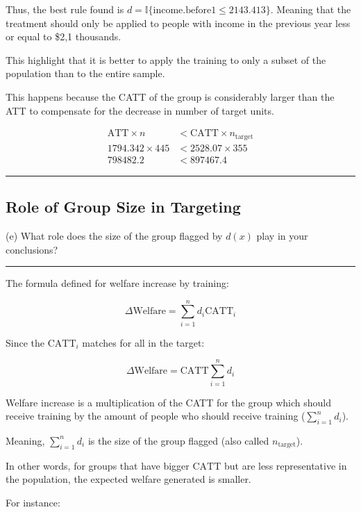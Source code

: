 \documentclass{article}
\newenvironment{colorparagraph}[1]{\par\color{#1}}{\par}
\begin{document}
Thus, the best rule found is $d = \mathbb{I} \{ \text{income.before1} \leq 2143.413\}$. Meaning that the treatment should only be applied to people with income in the previous year less or equal to \$2,1 thousands.

This highlight that it is better to apply the training to only a subset of the population than to the entire sample.

This happens because the CATT of the group is considerably larger than the ATT to compensate for the decrease in number of target units.

$$
\begin{aligned}
    \text{ATT} \times n &< \text{CATT} \times n_{\text{target}} \\
    1794.342 \times 445 &< 2528.07 \times 355 \\
    798482.2 &< 897467.4
\end{aligned}
$$

\begin{colorparagraph}{questioncolor}
\rule{\textwidth}{0.5pt}

\label{q4e}\subsection{Role of Group Size in Targeting}
(e) What role does the size of the group flagged by \( d(x) \) play in your conclusions?

\rule{\textwidth}{0.5pt}
\end{colorparagraph}

The formula defined for welfare increase by training:

$$
\Delta \text{Welfare} = \sum_{i = 1}^{n} d_i \text{CATT}_i
$$

Since the $\text{CATT}_i$ matches for all in the target:

$$
\Delta \text{Welfare} = \text{CATT} \sum_{i = 1}^{n} d_i
$$


Welfare increase is a multiplication of the CATT for the group which should receive training by the amount of people who should receive training ($\sum_{i = 1}^{n} d_i$).

Meaning, $\sum_{i = 1}^{n} d_i$ is the size of the group flagged (also called $n_{\text{target}}$).

In other words, for groups that have bigger $\text{CATT}$ but are less representative in the population, the expected welfare generated is smaller.

For instance:
\end{document}
